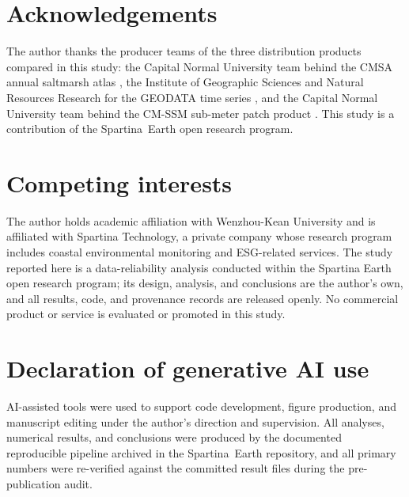 \documentclass[11pt]{article}
\begin{document}

\section*{Acknowledgements}

The author thanks the producer teams of the three distribution products
compared in this study: the Capital Normal University team behind the CMSA
annual saltmarsh atlas \citep{li_2024_cmsa}, the Institute of Geographic
Sciences and Natural Resources Research for the GEODATA time series
\citep{geodata_time_series}, and the Capital Normal University team behind
the CM-SSM sub-meter patch product \citep{zhou_2025_cmssm}. This study is a
contribution of the Spartina~Earth open research program.

\section*{Competing interests}

The author holds academic affiliation with Wenzhou-Kean University and is
affiliated with Spartina Technology, a private company whose research program
includes coastal environmental monitoring and ESG-related services. The study
reported here is a data-reliability analysis conducted within the Spartina
Earth open research program; its design, analysis, and conclusions are the
author's own, and all results, code, and provenance records are released
openly. No commercial product or service is evaluated or promoted in this
study.

\section*{Declaration of generative AI use}

AI-assisted tools were used to support code development, figure production,
and manuscript editing under the author's direction and supervision. All
analyses, numerical results, and conclusions were produced by the documented
reproducible pipeline archived in the Spartina~Earth repository, and all
primary numbers were re-verified against the committed result files during
the pre-publication audit.



\end{document}
